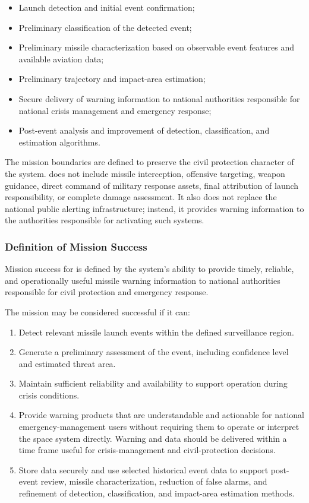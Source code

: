 \begin{itemize}
    \item Launch detection and initial event confirmation;
    \item Preliminary classification of the detected event;
    \item Preliminary missile characterization based on observable event features and available aviation data;
    \item Preliminary trajectory and impact-area estimation;
    \item Secure delivery of warning information to national authorities responsible for national crisis management and emergency response;
    \item Post-event analysis and improvement of detection, classification, and estimation algorithms.
\end{itemize}

The mission boundaries are defined to preserve the civil protection character of the system.  does not include missile interception, offensive targeting, weapon guidance, direct command of military response assets, final attribution of launch responsibility, or complete damage assessment. It also does not replace the national public alerting infrastructure; instead, it provides warning information to the authorities responsible for activating such systems.

\subsubsection{Definition of Mission Success}

Mission success for  is defined by the system's ability to provide timely, reliable, and operationally useful missile warning information to national authorities responsible for civil protection and emergency response.

The mission may be considered successful if it can:

\begin{enumerate}
    \item Detect relevant missile launch events within the defined surveillance region.
    \item Generate a preliminary assessment of the event, including confidence level and estimated threat area.
    \item Maintain sufficient reliability and availability to support operation during crisis conditions.
    \item Provide warning products that are understandable and actionable for national emergency-management users without requiring them to operate or interpret the space system directly. Warning and data should be delivered within a time frame useful for crisis-management and civil-protection decisions.
    \item Store data securely and use selected historical event data to support post-event review, missile characterization, reduction of false alarms, and refinement of detection, classification, and impact-area estimation methods.
\end{enumerate}